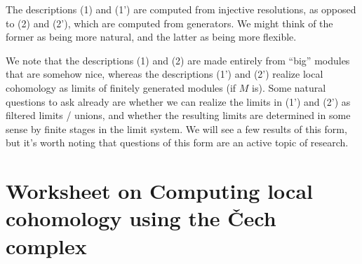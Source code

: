 \documentclass[11pt]{book}
\numberwithin{equation}{section}
\numberwithin{theorem}{chapter}
\theoremstyle{definition}
\newtheorem*{basic properties}{Basic Properties}
\newtheorem*{Important Remark}{Important Remark}
\theoremstyle{remark}
\begin{document}
The descriptions (1) and (1') are computed from injective resolutions, as opposed to (2) and (2'), which are computed from generators. We might think of the former as being more natural, and the latter as being more flexible.

 We note that the descriptions (1) and (2) are made entirely from ``big'' modules that are somehow nice, whereas the descriptions (1') and (2') realize local cohomology as limits of finitely generated modules (if $M$ is). Some natural questions to ask already are whether we can realize the limits in (1') and (2') as filtered limits / unions, and whether the resulting limits are determined in some sense by finite stages in the limit system. We will see a few results of this form, but it's worth noting that questions of this form are an active topic of research.

\section{Worksheet on Computing local cohomology using the \v{C}ech complex}
\end{document}
